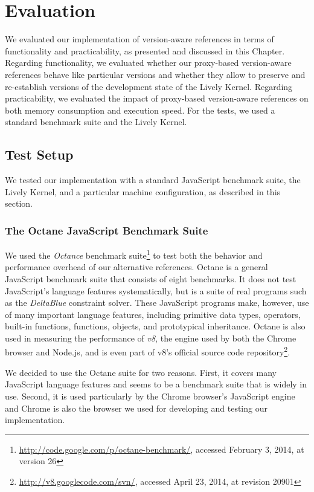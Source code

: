 \chapter{Evaluation} \label{chapter:EVALUATION}

We evaluated our implementation of version-aware references in terms of functionality and practicability, as presented and discussed in this Chapter.
Regarding functionality, we evaluated whether our proxy-based version-aware references behave like particular versions and whether they allow to preserve and re-establish versions of the development state of the Lively Kernel.
Regarding practicability, we evaluated the impact of proxy-based version-aware references on both memory consumption and execution speed.
For the tests, we used a standard benchmark suite and the Lively Kernel.


\section{Test Setup}

We tested our implementation with a standard JavaScript benchmark suite, the Lively Kernel, and a particular machine configuration, as described in this section.

\subsection{The Octane JavaScript Benchmark Suite}

We used the \emph{Octance} benchmark suite\footnote{\url{http://code.google.com/p/octane-benchmark/}, accessed February 3, 2014, at version 26} to test both the behavior and performance overhead of our alternative references.
Octane is a general JavaScript benchmark suite that consists of eight benchmarks.
It does not test JavaScript's language features systematically, but is a suite of real programs such as the \emph{DeltaBlue}\cite{FreemanBenson1990ICS} constraint solver.
These JavaScript programs make, however, use of many important language features, including primitive data types, operators, built-in functions, functions, objects, and prototypical inheritance.
Octane is also used in measuring the performance of \emph{v8}, the engine used by both the Chrome browser and Node.js, and is even part of v8's official source code repository\footnote{\url{http://v8.googlecode.com/svn/}, accessed April 23, 2014, at revision 20901}.

We decided to use the Octane suite for two reasons.
First, it covers many JavaScript language features and seems to be a benchmark suite that is widely in use.
Second, it is used particularly by the Chrome browser's JavaScript engine and Chrome is also the browser we used for developing and testing our implementation.


